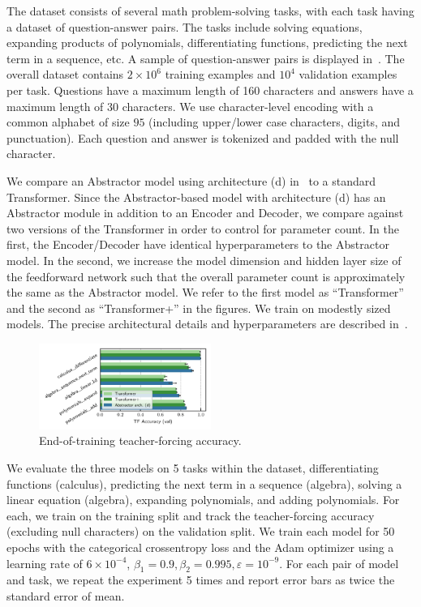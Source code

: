 The dataset consists of several math problem-solving tasks, with each task having a dataset of question-answer pairs. The tasks include solving equations, expanding products of polynomials, differentiating functions, predicting the next term in a sequence, etc. A sample of question-answer pairs is displayed in~. The overall dataset contains $2 \times 10^6$ training examples and $10^4$ validation examples per task. Questions have a maximum length of 160 characters and answers have a maximum length of 30 characters. We use character-level encoding with a common alphabet of size $95$ (including upper/lower case characters, digits, and punctuation). Each question and answer is tokenized and padded with the null character.

We compare an Abstractor model using architecture (d) in~ to a standard Transformer. Since the Abstractor-based model with architecture (d) has an Abstractor module in addition to an Encoder and Decoder, we compare against two versions of the Transformer in order to control for parameter count. In the first, the Encoder/Decoder have identical hyperparameters to the Abstractor model. In the second, we increase the model dimension and hidden layer size of the feedforward network such that the overall parameter count is approximately the same as the Abstractor model. We refer to the first model as ``Transformer'' and the second as ``Transformer+'' in the figures. We train on modestly sized models. The precise architectural details and hyperparameters are described in~.

\begin{figure}
    \centering
    \includegraphics[width=0.5\textwidth]{figures/experiments/math_metrics.pdf}
    \caption{\footnotesize End-of-training teacher-forcing accuracy.}\label{fig:math_metrics}
\end{figure}

We evaluate the three models on 5 tasks within the dataset, differentiating functions (calculus), predicting the next term in a sequence (algebra), solving a linear equation (algebra), expanding polynomials, and adding polynomials. For each, we train on the training split and track the teacher-forcing accuracy (excluding null characters) on the validation split. We train each model for 50 epochs with the categorical crossentropy loss and the Adam optimizer using a learning rate of $6 \times 10^{-4}$, $\beta_1 = 0.9, \beta_2 = 0.995, \varepsilon = 10^{-9}$. For each pair of model and task, we repeat the experiment 5 times and report error bars as twice the standard error of mean.

